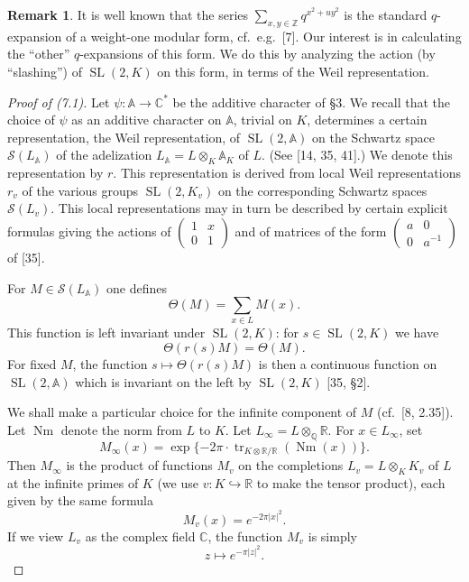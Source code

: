 \documentclass[12pt,a4paper]{article}
\theoremstyle{plain}
\theoremstyle{definition}
\newtheorem{remark}[theorem]{Remark}
\theoremstyle{remark}
\DeclareMathOperator{\SL}{SL}
\DeclareMathOperator{\tr}{tr}
\DeclareMathOperator{\Nm}{Nm}
\begin{document}
\begin{remark}
It is well known that the series $\sum_{x,y \in \mathbb{Z}} q^{x^2 + u y^2}$ is the standard $q$-expansion of a weight-one modular form, cf.~e.g.~[7]. Our interest is in calculating the ``other'' $q$-expansions of this form. We do this by analyzing the action (by ``slashing'') of $\SL(2,K)$ on this form, in terms of the Weil representation.
\end{remark}

\begin{proof}[Proof of (7.1)]
Let $\psi: \mathbb{A} \to \mathbb{C}^*$ be the additive character of \S3. We recall that the choice of $\psi$ as an additive character on $\mathbb{A}$, trivial on $K$, determines a certain representation, the Weil representation, of $\SL(2, \mathbb{A})$ on the Schwartz space $\mathscr{S}(L_{\mathbb{A}})$ of the adelization $L_{\mathbb{A}} = L \otimes_K \mathbb{A}_K$ of $L$. (See [14, 35, 41].) We denote this representation by $r$. This representation is derived from local Weil representations $r_v$ of the various groups $\SL(2, K_v)$ on the corresponding Schwartz spaces $\mathscr{S}(L_v)$. This local representations may in turn be described by certain explicit formulas giving the actions of $\begin{pmatrix} 1 & x \\ 0 & 1 \end{pmatrix}$ and of matrices of the form $\begin{pmatrix} a & 0 \\ 0 & a^{-1} \end{pmatrix}$ of [35].

For $M \in \mathscr{S}(L_{\mathbb{A}})$ one defines
\[
\Theta(M) = \sum_{x \in L} M(x).
\]
This function is left invariant under $\SL(2,K)$: for $s \in \SL(2,K)$ we have
\[
\Theta(r(s)M) = \Theta(M).
\]
For fixed $M$, the function $s \mapsto \Theta(r(s)M)$ is then a continuous function on $\SL(2, \mathbb{A})$ which is invariant on the left by $\SL(2,K)$ [35, \S2].

We shall make a particular choice for the infinite component of $M$ (cf.~[8, 2.35]). Let $\Nm$ denote the norm from $L$ to $K$. Let $L_\infty = L \otimes_{\mathbb{Q}} \mathbb{R}$. For $x \in L_\infty$, set
\[
M_\infty(x) = \exp\{-2\pi \cdot \tr_{K \otimes \mathbb{R}/\mathbb{R}}(\Nm(x))\}.
\]
Then $M_\infty$ is the product of functions $M_v$ on the completions $L_v = L \otimes_K K_v$ of $L$ at the infinite primes of $K$ (we use $v: K \hookrightarrow \mathbb{R}$ to make the tensor product), each given by the same formula
\[
M_v(x) = e^{-2\pi |x|^2}.
\]
If we view $L_v$ as the complex field $\mathbb{C}$, the function $M_v$ is simply
\[
z \mapsto e^{-\pi |z|^2}.
\]


\end{proof}
\end{document}
